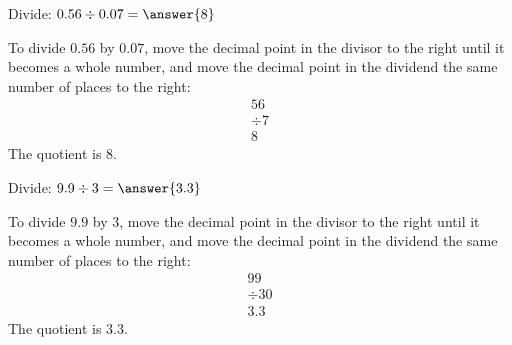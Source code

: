 \documentclass{ximera}
\begin{document}
\begin{problem}
Divide: $0.56 \div 0.07 = \answer{8}$
\begin{feedback}
To divide $0.56$ by $0.07$, move the decimal point in the divisor to the right until it becomes a whole number, and move the decimal point in the dividend the same number of places to the right:
\begin{align*}
  56 \\
\div 7 \\
\hline
  8
\end{align*}
The quotient is $8$.
\end{feedback}
\end{problem}

\begin{problem}
Divide: $9.9 \div 3 = \answer{3.3}$
\begin{feedback}
To divide $9.9$ by $3$, move the decimal point in the divisor to the right until it becomes a whole number, and move the decimal point in the dividend the same number of places to the right:
\begin{align*}
  99 \\
\div 30 \\
\hline
  3.3
\end{align*}
The quotient is $3.3$.
\end{feedback}
\end{problem}

\end{document}

